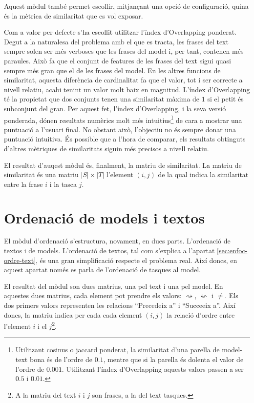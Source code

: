 Aquest mòdul també permet escollir, mitjançant una opció de configuració, quina és la mètrica de similaritat que es vol exposar.

Com a valor per defecte s'ha escollit utilitzar l'índex d'Overlapping ponderat. Degut a la naturalesa del problema amb el que es tracta, les frases del text sempre solen ser més verboses que les frases del model i, per tant, contenen més paraules. Això fa que el conjunt de features de les frases del text sigui quasi sempre més gran que el de les frases del model. En les altres funcions de similaritat, aquesta diferència de cardinalitat fa que el valor, tot i ser correcte a nivell relatiu, acabi tenint un valor molt baix en magnitud. L'índex d'Overlapping té la propietat que dos conjunts tenen una similaritat màxima de $1$ si el petit és subconjunt del gran. Per aquest fet, l'índex d'Overlapping, i la seva versió ponderada, dónen resultats numèrics molt més intuitius\footnote{Utilitzant cosinus o jaccard ponderat, la similaritat d'una parella de model-text bona és de l'ordre de $0.1$, mentre que si la parella és dolenta el valor de l'ordre de $0.001$. Utilitzant l'índex d'Overlapping aquests valors passen a ser $0.5$ i $0.01$.} de cara a mostrar una puntuació a l'usuari final. No obstant això, l'objectiu no és sempre donar una puntuació intuitiva. És possible que a l'hora de comparar, els resultats obtinguts d'altres mètriques de similaritats siguin més precisos a nivell relatiu.

El resultat d'auqest mòdul és, finalment, la matriu de similaritat. La matriu de similaritat és una matriu $|S|\times|T|$ l'element $(i,j)$ de la qual indica la similaritat entre la frase $i$ i la tasca $j$.

\section{Ordenació de models i textos}
\label{sec:implementacio-ordenacio}

El mòdul d'ordenació s'estructura, novament, en dues parts. L'ordenació de textos i de models. L'ordenació de textos, tal com s'explica a l'apartat \ref{sec:enfoc-ordre-text}, és una gran simplificació respecte el problema real. Així doncs, en aquest apartat només es parla de l'ordenació de tasques al model.

El resultat del mòdul son dues matrius, una pel text i una pel model. En aquestes dues matrius, cada element pot prendre els valors: $\rightsquigarrow$, $\leftsquigarrow$ i $\neq$. Els dos primers valors representen les relacions ``Precedeix a'' i ``Succeeix a''. Així doncs, la matriu indica per cada cada element $(i,j)$ la relació d'ordre entre l'element $i$ i el $j$\footnote{A la matriu del text $i$ i $j$ son frases, a la del text tasques.}. 

